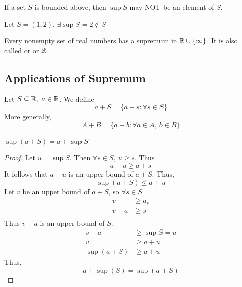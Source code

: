 \documentclass[a4paper,12pt]{article}
\begin{document}
\begin{remark} If a set \(S\) is bounded above, then \(\sup S\) may NOT be an element of \(S\).\\
    \begin{example}
        Let \(S=(1,2)\). \(\exists\sup S=2\notin S\)\\
    \end{example}
\end{remark}

\begin{axiom}
    
\end{axiom} Every nonempty set of real numbers has a supremum in \(\mathbb{R}\cup\{\infty\}\). It is also called  or  or \(\mathbb{R}\).

\newpage

\subsection{Applications of Supremum}

\begin{definition}
    Let \(S\subseteq\mathbb{R},\ a\in\mathbb{R}\). We define 
    \[a+S=\{a+s:\forall s\in S\}\]
    More generally, 
    \[A+B=\{a+b:\forall a\in A,\ b\in B\}\]
\end{definition}

\begin{proposition}\(\sup (a+S)=a+\sup S\)
    \begin{proof}
        Let \(u=\sup S\). Then \(\forall s\in S,\ u\ge s\). Thus 
        \[a+u\ge a+s\]
        It follows that \(a+u\) is an upper bound of \(a+S\). Thus,
        \[\sup(a+S)\le a+u\]
        Let \(v\) be an upper bound of \(a+S\), so \(\forall s\in S\)
        \begin{align*}
            v&\ge a_s\\
            v-a&\ge s\\
        \end{align*}
        Thus \(v-a\) is an upper bound of \(S\).
        \begin{align*}
            v-a&\ge\sup S=u\\
            v&\ge a+u\\
            \sup(a+S)&\ge a+u
        \end{align*}
        Thus, 
        \[a+\sup(S)=\sup(a+S)\]
    \end{proof}
\end{proposition}
\end{document}
